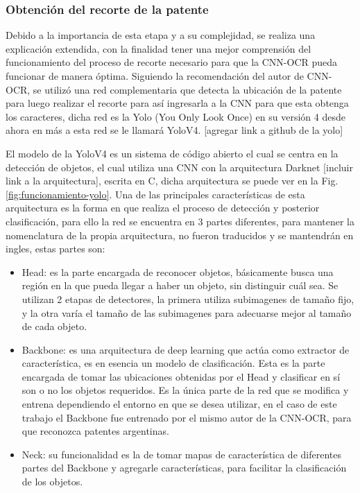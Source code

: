 \subsubsection*{Obtención del recorte de la patente}

Debido a la importancia de esta etapa y a su complejidad, se realiza una explicación extendida, con la finalidad tener una mejor comprensión del funcionamiento del proceso de recorte necesario para que la CNN-OCR pueda funcionar de manera óptima. Siguiendo la recomendación del autor de CNN-OCR, se utilizó una red complementaria que detecta la ubicación de la patente para luego realizar el recorte para así ingresarla a la CNN para que esta obtenga los caracteres, dicha red es la Yolo (You Only Look Once) en su versión 4 desde ahora en más a esta red se 
le llamará YoloV4. [agregar link a github de la yolo]


El modelo de la YoloV4 es un sistema de código abierto el cual se centra en la detección de objetos, el cual utiliza una CNN con la 
arquitectura Darknet [incluir link a la arquitectura], escrita en C, dicha arquitectura se puede ver en la Fig.\ref{fig:funcionamiento-yolo}.
Una de las principales características de esta arquitectura es la forma en que realiza el proceso de detección y posterior clasificación, para ello la red se encuentra en 3 partes diferentes, para mantener la nomenclatura de la propia arquitectura, no fueron traducidos y se mantendrán en ingles, estas partes son:
\begin{itemize}
    \item Head: es la parte encargada de reconocer objetos, básicamente busca una región en la que pueda llegar a haber un objeto, sin distinguir cuál sea. Se utilizan 2 etapas de detectores, la primera utiliza subimagenes de tamaño fijo, y la otra varía el tamaño de las subimagenes para adecuarse mejor al tamaño de cada objeto.
    \item Backbone: es una arquitectura de deep learning que actúa como extractor de característica, es en esencia un modelo de clasificación. Esta es la parte encargada de tomar las ubicaciones obtenidas por el Head y clasificar en sí son o no los objetos requeridos. Es la única parte de la red que se modifica y entrena dependiendo el entorno en que se desea utilizar, en el caso de este trabajo el Backbone fue entrenado por el mismo autor de la CNN-OCR, para que reconozca patentes argentinas. 
    \item Neck: su funcionalidad es la de tomar mapas de característica de diferentes partes del Backbone y agregarle características, para facilitar la clasificación de los objetos.
\end{itemize}

